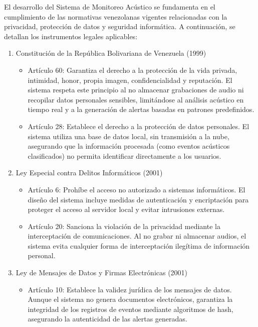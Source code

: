 
El desarrollo del Sistema de Monitoreo Acústico se fundamenta en el cumplimiento de las normativas venezolanas vigentes relacionadas con la privacidad, protección de datos y seguridad informática. A continuación, se detallan los instrumentos legales aplicables:

\begin{enumerate}
  \item Constitución de la República Bolivariana de Venezuela (1999)
        \begin{itemize}
          \item Artículo 60: Garantiza el derecho a la protección de la vida privada, intimidad, honor, propia imagen, confidencialidad y reputación. El sistema respeta este principio al no almacenar grabaciones de audio ni recopilar datos personales sensibles, limitándose al análisis acústico en tiempo real y a la generación de alertas basadas en patrones predefinidos.
          \item Artículo 28: Establece el derecho a la protección de datos personales. El sistema utiliza una base de datos local, sin transmisión a la nube, asegurando que la información procesada (como eventos acústicos clasificados) no permita identificar directamente a los usuarios.
        \end{itemize}
  \item Ley Especial contra Delitos Informáticos (2001)
        \begin{itemize}
          \item Artículo 6: Prohíbe el acceso no autorizado a sistemas informáticos. El diseño del sistema incluye medidas de autenticación y encriptación para proteger el acceso al servidor local y evitar intrusiones externas.
          \item Artículo 20: Sanciona la violación de la privacidad mediante la interceptación de comunicaciones. Al no grabar ni almacenar audios, el sistema evita cualquier forma de interceptación ilegítima de información personal.
        \end{itemize}
  \item Ley de Mensajes de Datos y Firmas Electrónicas (2001)
        \begin{itemize}
          \item Artículo 10: Establece la validez jurídica de los mensajes de datos. Aunque el sistema no genera documentos electrónicos, garantiza la integridad de los registros de eventos mediante algoritmos de hash, asegurando la autenticidad de las alertas generadas.

\end{itemize}
\end{enumerate}
